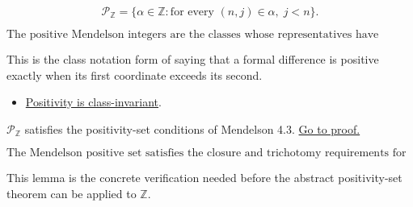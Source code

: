 \begin{definition}
\label{def:men-positive-set}
\[
  \mathcal{P}_{\mathbb{Z}}
  =
  \{\alpha\in\mathbb{Z}: \text{for every }(n,j)\in\alpha,\; j<n\}.
\]
\end{definition}


\begin{remark*}
\[
  \text{The positive Mendelson integers are the classes whose representatives
  have second coordinate less than first coordinate.}
\]
\end{remark*}

\begin{remark*}[Interpretation]
This is the class notation form of saying that a formal difference is
positive exactly when its first coordinate exceeds its second.
\end{remark*}

\begin{dependencies}
\begin{itemize}
  \item \hyperref[lem:men-positivity-class-invariant]{Positivity is class-invariant}.
\end{itemize}
\end{dependencies}

\begin{lemma}[Mendelson 4.5]
\label{lem:men-positive-set-conditions}
\(\mathcal{P}_{\mathbb{Z}}\) satisfies the positivity-set conditions of
Mendelson 4.3.
\hyperref[prf:men-positive-set-conditions]{Go to proof.}
\end{lemma}

\begin{remark*}
\[
  \text{The Mendelson positive set satisfies the closure and trichotomy
  requirements for constructing an order.}
\]
\end{remark*}

\begin{remark*}[Interpretation]
This lemma is the concrete verification needed before the abstract
positivity-set theorem can be applied to \(\mathbb{Z}\).
\end{remark*}

